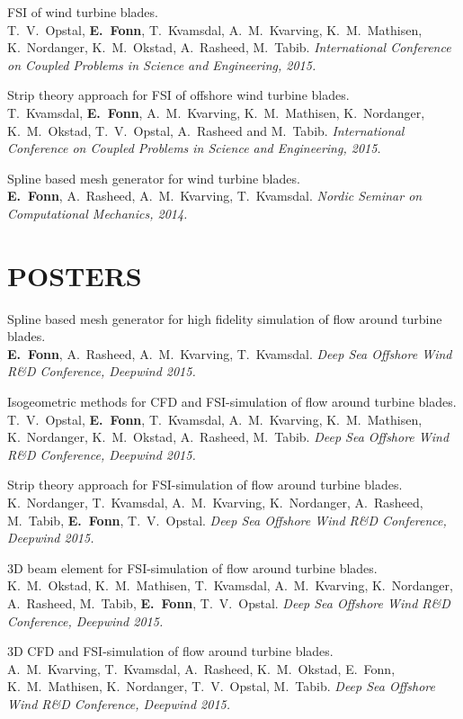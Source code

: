 \documentclass[line,margin]{res}
\begin{document}
\begin{resume}
FSI of wind turbine blades. \\
T.~V.~Opstal, {\bf E.~Fonn}, T.~Kvamsdal, A.~M.~Kvarving, K.~M.~Mathisen,
K.~Nordanger, K.~M.~Okstad, A.~Rasheed, M.~Tabib.
{\em {} International Conference on Coupled Problems in Science and Engineering, 2015.}

Strip theory approach for FSI of offshore wind turbine blades. \\
T.~Kvamsdal, {\bf E.~Fonn}, A.~M.~Kvarving, K.~M.~Mathisen, K.~Nordanger,
K.~M.~Okstad, T.~V.~Opstal, A.~Rasheed and M.~Tabib.
{\em {} International Conference on Coupled Problems in Science and Engineering, 2015.}

Spline based mesh generator for wind turbine blades. \\
{\bf E.~Fonn}, A.~Rasheed, A.~M.~Kvarving, T.~Kvamsdal.
{\em {} Nordic Seminar on Computational Mechanics, 2014.}


\section{POSTERS}

Spline based mesh generator for high fidelity simulation of flow around turbine blades. \\
{\bf E.~Fonn}, A.~Rasheed, A.~M.~Kvarving, T.~Kvamsdal.
{\em {} Deep Sea Offshore Wind R\&D Conference, Deepwind 2015.}

Isogeometric methods for CFD and FSI-simulation of flow around turbine blades. \\
T.~V.~Opstal, {\bf E.~Fonn}, T.~Kvamsdal, A.~M.~Kvarving, K.~M.~Mathisen,
K.~Nordanger, K.~M.~Okstad, A.~Rasheed, M.~Tabib.
{\em {} Deep Sea Offshore Wind R\&D Conference, Deepwind 2015.}

Strip theory approach for FSI-simulation of flow around turbine blades. \\
K.~Nordanger, T.~Kvamsdal, A.~M.~Kvarving, K.~Nordanger, A.~Rasheed, M.~Tabib,
{\bf E.~Fonn}, T.~V.~Opstal.
{\em {} Deep Sea Offshore Wind R\&D Conference, Deepwind 2015.}

3D beam element for FSI-simulation of flow around turbine blades. \\
K.~M.~Okstad, K.~M.~Mathisen, T.~Kvamsdal, A.~M.~Kvarving, K.~Nordanger,
A.~Rasheed, M.~Tabib, {\bf E.~Fonn}, T.~V.~Opstal.
{\em {} Deep Sea Offshore Wind R\&D Conference, Deepwind 2015.}

3D CFD and FSI-simulation of flow around turbine blades. \\
A.~M.~Kvarving, T.~Kvamsdal, A.~Rasheed, K.~M.~Okstad, E.~Fonn, K.~M.~Mathisen,
K.~Nordanger, T.~V.~Opstal, M.~Tabib.
{\em {} Deep Sea Offshore Wind R\&D Conference, Deepwind 2015.}


\end{resume}
\end{document}

